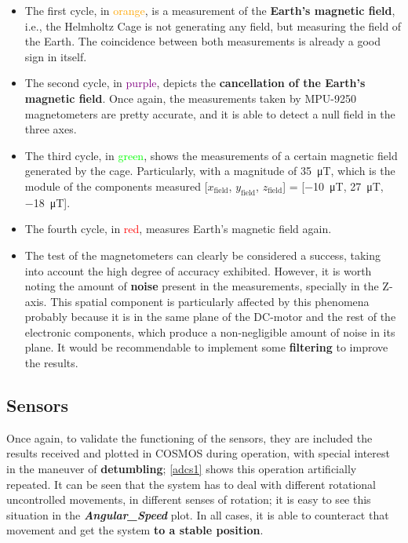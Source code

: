 \begin{itemize} [topsep=0pt]

\item The first cycle, in \textcolor{orange}{orange}, is a measurement of the \textbf{Earth's magnetic field}, i.e., the Helmholtz Cage is not generating any field, but measuring the field of the Earth. The coincidence between both measurements is already a good sign in itself.

\item The second cycle, in \textcolor{purple}{purple}, depicts the \textbf{cancellation of the Earth's magnetic field}. Once again, the measurements taken by MPU-9250 magnetometers are pretty accurate, and it is able to detect a null field in the three axes.

\item The third cycle, in \textcolor{lime}{green}, shows the measurements of a certain magnetic field generated by the cage. Particularly, with a magnitude of \SI{35}{\micro T}, which is the module of the components measured [$x_{\text{field}}$, $y_{\text{field}}$, $z_{\text{field}}$] = [\SI{-10}{\micro T}, \SI{27}{\micro T}, \SI{-18}{\micro T}].

\item The fourth cycle, in \textcolor{red}{red}, measures Earth's magnetic field again.

\item The test of the magnetometers can clearly be considered a success, taking into account the high degree of accuracy exhibited. However, it is worth noting the amount of \textbf{noise} present in the measurements, specially in the Z-axis. This spatial component is particularly affected by this phenomena probably because it is in the same plane of the DC-motor and the rest of the electronic components, which produce a non-negligible amount of noise in its plane. It would be recommendable to implement some \textbf{filtering} to improve the results.

\end{itemize}

\vspace{-0.3cm}
\subsection{Sensors} 

Once again, to validate the functioning of the sensors, they are included the results received and plotted in COSMOS during operation, with special interest in the maneuver of \textbf{detumbling}; \autoref{adcs1} shows this operation artificially repeated. It can be seen that the system has to deal with different rotational uncontrolled movements, in different senses of rotation; it is easy to see this situation in the \textit{\textbf{Angular\_Speed}} plot. In all cases, it is able to counteract that movement and get the system \textbf{to a stable position}. 

